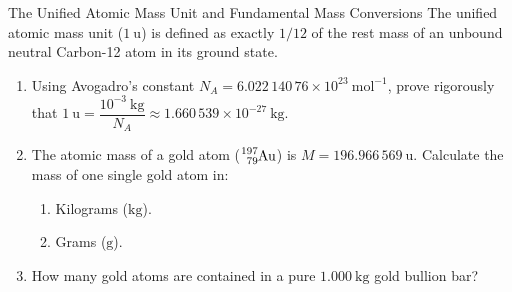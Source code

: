 \begin{exercise}{The Unified Atomic Mass Unit and Fundamental Mass Conversions}
The unified atomic mass unit ($1\ \mathrm{u}$) is defined as exactly $1/12$ of the rest mass of an unbound neutral Carbon-12 atom in its ground state.
\begin{enumerate}[leftmargin=1.5em,itemsep=2pt]
  \item Using Avogadro's constant $N_A = 6.022\,140\,76 \times 10^{23}\ \mathrm{mol^{-1}}$, prove rigorously that $1\ \mathrm{u} = \dfrac{10^{-3}\ \mathrm{kg}}{N_A} \approx 1.660\,539 \times 10^{-27}\ \mathrm{kg}$.
  \item The atomic mass of a gold atom ($\ce{^{197}_{79}Au}$) is $M = 196.966\,569\ \mathrm{u}$. Calculate the mass of one single gold atom in:
  \begin{enumerate}[leftmargin=1.2em,itemsep=1pt]
    \item Kilograms ($\mathrm{kg}$).
    \item Grams ($\mathrm{g}$).
  \end{enumerate}
  \item How many gold atoms are contained in a pure $1.000\ \mathrm{kg}$ gold bullion bar?
\end{enumerate}
\end{exercise}

\begin{tabletworkspace}[5.0cm]
\end{tabletworkspace}

